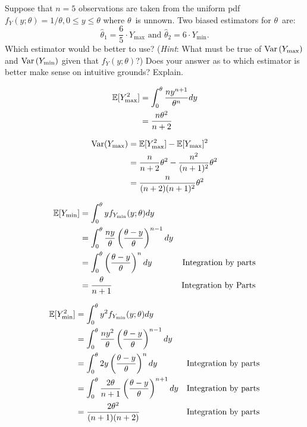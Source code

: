 \begin{problem}
   Suppose that ${n = 5}$ observations are taken from the uniform pdf ${f_{Y}(y;\theta) = 1/\theta, 0 \leq y \leq \theta}$ where $\theta$~is unnown.  Two biased estimators for $\theta$~are:
  \begin{equation*}
    \hat{\theta}_1 = \frac{6}{5} \cdot Y_{\max} \text{ and } \hat{\theta}_2 = 6\cdot Y_{\min}\text{.}
  \end{equation*}
  \noindent
  Which estimator would be better to use? (\textit{Hint}: What must be true of $\text{Var}\left(Y_{\max}\right)$ and $\text{Var}\left(Y_{\min}\right)$ given that ${f_{Y}(y;\theta)}$?) Does your answer as to which estimator is better make sense on intuitive grounds? Explain.
\end{problem}

\begin{align*}
  \mathbb{E}\lbrack Y_{\max}^2\rbrack &= \int_{0}^{\theta} \frac{n y^{n+1}}{\theta^{n}} dy \\
                                &= \frac{n\theta^2}{n+2}
\end{align*}

\begin{align*}
  \text{Var}(Y_{\max}) &= \mathbb{E}\lbrack Y_{\max}^2\rbrack - \mathbb{E}\lbrack Y_{\max}\rbrack^{2} \\
                       &= \frac{n}{n+2}\theta^2 - \frac{n^2}{(n+1)^{2}}\theta^2 \\
                       &= \frac{n}{(n+2)(n+1)^{2}}\theta^{2}
\end{align*}

\begin{align*}
  \mathbb{E}\lbrack Y_{\min}\rbrack &= \int_{0}^{\theta} y f_{Y_{\min}}(y;\theta)dy \\
                    &= \int_{0}^{\theta} \frac{ny}{\theta}\left(\frac{\theta -y}{\theta}\right)^{n-1} dy \\
                    &= \int_{0}^{\theta} \left(\frac{\theta -y}{\theta}\right)^{n} dy & \text{Integration by parts} \\
                    &= \frac{\theta}{n+1} & \text{Integration by Parts}
\end{align*}

\begin{align*}
  \mathbb{E}\lbrack Y_{\min}^{2}\rbrack &= \int_{0}^{\theta} y^2 f_{Y_{\min}}(y;\theta)dy \\
                    &= \int_{0}^{\theta} \frac{ny^2}{\theta}\left(\frac{\theta -y}{\theta}\right)^{n-1} dy \\
                    &= \int_{0}^{\theta} 2y\left(\frac{\theta -y}{\theta}\right)^{n} dy & \text{Integration by parts} \\
                    &= \int_{0}^{\theta} \frac{2\theta}{n+1} \left(\frac{\theta -y}{\theta}\right)^{n+1} dy & \text{Integration by parts} \\
                    &= \frac{2\theta^2}{(n+1)(n+2)} & \text{Integration by parts}
\end{align*}

